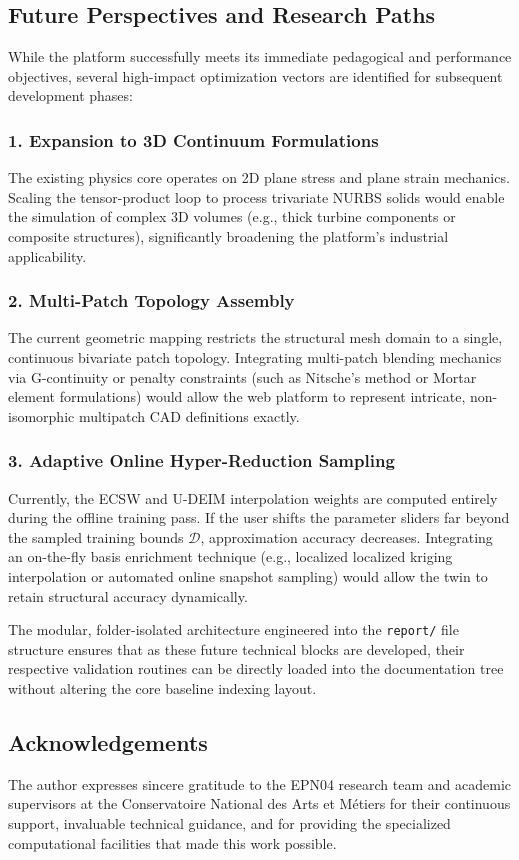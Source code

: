 \subsection{Future Perspectives and Research Paths}
While the platform successfully meets its immediate pedagogical and performance objectives, several high-impact optimization vectors are identified for subsequent development phases:

\subsubsection{1. Expansion to 3D Continuum Formulations}
The existing physics core operates on 2D plane stress and plane strain mechanics. Scaling the tensor-product loop to process trivariate NURBS solids would enable the simulation of complex 3D volumes (e.g., thick turbine components or composite structures), significantly broadening the platform's industrial applicability.

\subsubsection{2. Multi-Patch Topology Assembly}
The current geometric mapping restricts the structural mesh domain to a single, continuous bivariate patch topology. Integrating multi-patch blending mechanics via G-continuity or penalty constraints (such as Nitsche's method or Mortar element formulations) would allow the web platform to represent intricate, non-isomorphic multipatch CAD definitions exactly.

\subsubsection{3. Adaptive Online Hyper-Reduction Sampling}
Currently, the ECSW and U-DEIM interpolation weights are computed entirely during the offline training pass. If the user shifts the parameter sliders far beyond the sampled training bounds $\mathcal{D}$, approximation accuracy decreases. Integrating an on-the-fly basis enrichment technique (e.g., localized localized kriging interpolation or automated online snapshot sampling) would allow the twin to retain structural accuracy dynamically.

\begin{devnote}
The modular, folder-isolated architecture engineered into the \texttt{report/} file structure ensures that as these future technical blocks are developed, their respective validation routines can be directly loaded into the documentation tree without altering the core baseline indexing layout.
\end{devnote}

\subsection*{Acknowledgements}
The author expresses sincere gratitude to the EPN04 research team and academic supervisors at the Conservatoire National des Arts et Métiers for their continuous support, invaluable technical guidance, and for providing the specialized computational facilities that made this work possible.